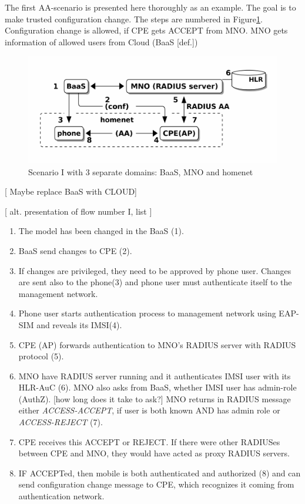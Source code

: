 \documentclass[12pt,a4paper,english]{tutthesis}
\begin{document}
\label{scenario-i}
The first AA-scenario is presented here thoroughly as an example.
The goal is to make trusted configuration change. 
The steps are numbered in Figure\ref{fig:scenario-I}.
Configuration change is allowed, if CPE gets ACCEPT from MNO.  MNO gets
information of allowed users from Cloud (BaaS [def.])


\begin{figure}[htb]
\centering
\includegraphics[width=.9\linewidth]{scenI.png}
\caption{\label{fig:scenario-I}Scenario I with 3 separate domains: BaaS, MNO and homenet}
\end{figure}

[ Maybe replace BaaS with CLOUD] 


[ alt. presentation of flow number I, list ] 

\begin{enumerate}
\item The model has been changed in the BaaS (1).
\item BaaS send changes to CPE (2).
\item If changes are privileged, they need to be approved by phone user.
Changes are sent also to the phone(3) and phone user must authenticate
itself to the management network.
\item Phone user starts authentication process to management
network using EAP-SIM and reveals its IMSI(4).
\item CPE  (AP) forwards authentication to MNO's RADIUS server with
RADIUS protocol (5).
\item MNO have RADIUS server running and it authenticates IMSI user with
  its HLR-AuC (6).
MNO also asks from BaaS, whether IMSI user has admin-role (AuthZ). [how long does it take to ask?]
MNO returns in RADIUS message either \emph{ACCESS-ACCEPT}, if user is both known AND has admin role 
  or \emph{ACCESS-REJECT} (7).
\item CPE receives this ACCEPT or REJECT. If there were other RADIUSes
between CPE and MNO, they would have acted
as proxy RADIUS servers.
\item IF ACCEPTed, then mobile is both authenticated and authorized (8) and
can send configuration change message to CPE, which recognizes it
coming from authentication network.
\end{enumerate}
\end{document}
